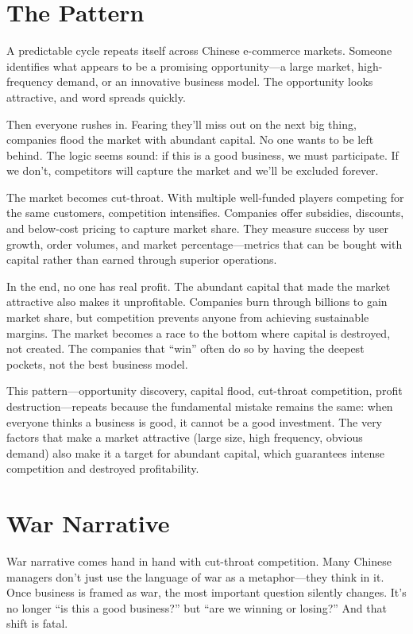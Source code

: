 \section{The Pattern}

A predictable cycle repeats itself across Chinese e-commerce markets. Someone identifies what appears to be a promising opportunity—a large market, high-frequency demand, or an innovative business model. The opportunity looks attractive, and word spreads quickly.

Then everyone rushes in. Fearing they'll miss out on the next big thing, companies flood the market with abundant capital. No one wants to be left behind. The logic seems sound: if this is a good business, we must participate. If we don't, competitors will capture the market and we'll be excluded forever.

The market becomes cut-throat. With multiple well-funded players competing for the same customers, competition intensifies. Companies offer subsidies, discounts, and below-cost pricing to capture market share. They measure success by user growth, order volumes, and market percentage—metrics that can be bought with capital rather than earned through superior operations.

In the end, no one has real profit. The abundant capital that made the market attractive also makes it unprofitable. Companies burn through billions to gain market share, but competition prevents anyone from achieving sustainable margins. The market becomes a race to the bottom where capital is destroyed, not created. The companies that ``win'' often do so by having the deepest pockets, not the best business model.

This pattern—opportunity discovery, capital flood, cut-throat competition, profit destruction—repeats because the fundamental mistake remains the same: when everyone thinks a business is good, it cannot be a good investment. The very factors that make a market attractive (large size, high frequency, obvious demand) also make it a target for abundant capital, which guarantees intense competition and destroyed profitability.

\section{War Narrative}
War narrative comes hand in hand with cut-throat competition.
Many Chinese managers don't just use the language of war as a metaphor—they think in it. Once business is framed as war, the most important question silently changes. It's no longer ``is this a good business?'' but ``are we winning or losing?'' And that shift is fatal.

